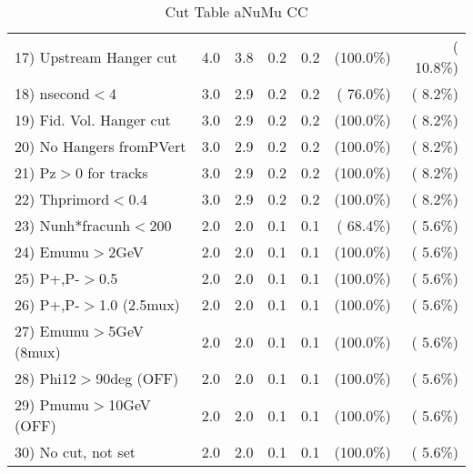 \begin{table}[h!]
\begin{tabular}{||l||r|r|r|r|r|r||}
 17) Upstream Hanger cut  &          4.0 &          3.8 &          0.2 &          0.2 & (100.0\%) & ( 10.8\%) \\
 18) nsecond$<$4          &          3.0 &          2.9 &          0.2 &          0.2 & ( 76.0\%) & (  8.2\%) \\
 19) Fid. Vol. Hanger cut &          3.0 &          2.9 &          0.2 &          0.2 & (100.0\%) & (  8.2\%) \\
 20) No Hangers fromPVert &          3.0 &          2.9 &          0.2 &          0.2 & (100.0\%) & (  8.2\%) \\
 21) Pz$>$0 for tracks    &          3.0 &          2.9 &          0.2 &          0.2 & (100.0\%) & (  8.2\%) \\
 22) Thprimord$<$0.4      &          3.0 &          2.9 &          0.2 &          0.2 & (100.0\%) & (  8.2\%) \\
 23) Nunh*fracunh$<$200   &          2.0 &          2.0 &          0.1 &          0.1 & ( 68.4\%) & (  5.6\%) \\
 24) Emumu$>$2GeV         &          2.0 &          2.0 &          0.1 &          0.1 & (100.0\%) & (  5.6\%) \\
 25) P+,P-$>$0.5          &          2.0 &          2.0 &          0.1 &          0.1 & (100.0\%) & (  5.6\%) \\
 26) P+,P-$>$1.0 (2.5mux) &          2.0 &          2.0 &          0.1 &          0.1 & (100.0\%) & (  5.6\%) \\
 27) Emumu$>$5GeV  (8mux) &          2.0 &          2.0 &          0.1 &          0.1 & (100.0\%) & (  5.6\%) \\
 28) Phi12$>$90deg  (OFF) &          2.0 &          2.0 &          0.1 &          0.1 & (100.0\%) & (  5.6\%) \\
 29) Pmumu$>$10GeV  (OFF) &          2.0 &          2.0 &          0.1 &          0.1 & (100.0\%) & (  5.6\%) \\
 30) No cut, not set      &          2.0 &          2.0 &          0.1 &          0.1 & (100.0\%) & (  5.6\%) \\
 \hline
 \hline
 \end{tabular}
 \caption{Cut Table  aNuMu CC }
 \label{tab-cutcohjpsi-mumu_res}
 \end{table}
